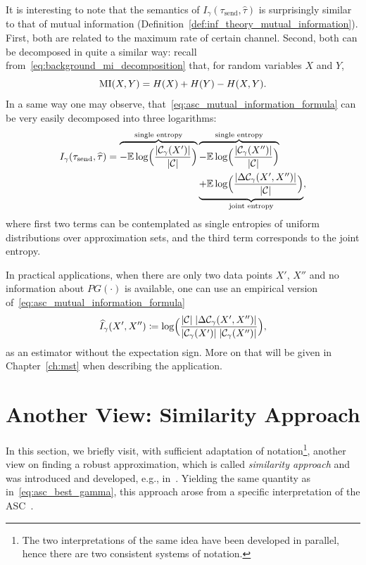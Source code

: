 \myremark It is interesting to note that the semantics of $I_\gamma(\tau_\text{send}, \hat
\tau)$ is surprisingly similar to that of mutual information
(Definition~\ref{def:inf_theory_mutual_information}). First, both are related to
the maximum rate of certain channel. Second,  both can be decomposed in quite a
similar way: recall from~\eqref{eq:background_mi_decomposition} that, for random
variables $X$ and $Y$,
\begin{equation*}
  \mathrm{MI}(X, Y) = H(X) + H(Y) - H(X, Y).
\end{equation*}
In a same way one may observe, that~\eqref{eq:asc_mutual_information_formula}
can be very easily decomposed into three logarithms:
\begin{align}
  I_\gamma(\tau_\text{send}, \widehat \tau) =  \overbrace{- \mathbb{E} \log 
  \Bigl(
    \frac{|\mathcal{C}_\gamma(X')|}{ |{\cal C}| }
  \Bigr)}^{\text{single entropy}}
  &\overbrace{- \mathbb{E} \log 
  \Bigl(
    \frac{|\mathcal{C}_\gamma(X'')|}{|{\cal C}|}
  \Bigr)}^{\text{single entropy}} \notag \\
  &\underbrace{+\mathbb{E} \log 
  \Bigl(
    \frac{|\Delta \mathcal{C}_\gamma(X', X'')|}{ |{\cal C}| }
  \Bigr)}_{\text{joint entropy}},
\end{align}
where first two terms can be contemplated as single entropies of uniform
distributions over approximation sets, and the third term corresponds to
the joint entropy.

\myremark In practical applications, when there are only two data points $X'$, $X''$ and
no information about $PG(\cdot)$ is available, one can use an empirical version
of~\eqref{eq:asc_mutual_information_formula}
\begin{equation}\label{eq:asc_mutual_information_formula_wo_expct}
\hat I_\gamma(X', X'') \coloneqq  \log 
  \Bigl(
    \frac{|\C| \; |\Delta \mathcal{C}_\gamma(X', X'')|}%
      {|\mathcal{C}_\gamma(X')| \; |\mathcal{C}_\gamma(X'')|}
  \Bigr),
\end{equation}
%
as an estimator without the expectation sign. More on that will be given in
Chapter~\ref{ch:mst} when describing the application.

\section{Another View: Similarity Approach}
\label{sec:similarity_approach_intro}

In this section, we briefly visit, with sufficient adaptation of
notation\footnote{The two interpretations of the same idea have been
developed in parallel, hence there are two consistent systems of notation.},
another view on finding a robust approximation, which is called
\textit{similarity approach} and was introduced and developed, e.g.,
in~\citep{Sramek:PhD,Proeger:PhD,jcss:2017}. Yielding the same quantity as
in~\eqref{eq:asc_best_gamma}, this approach arose from a specific interpretation
of the ASC~\citep{conf/isit/Buhmann10}.


